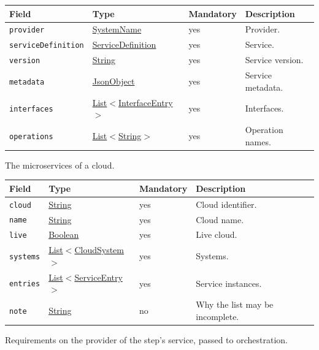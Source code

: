 \documentclass[a4paper]{arrowhead}
\newcommand{\mref}[1]{{\textcolor{ArrowheadPurple}{\hyperref[sec:model:#1]{#1}}}}
\newcommand{\pref}[1]{{\textcolor{ArrowheadGrey}{\hyperref[sec:model:primitives:#1]{#1}}}}
\begin{document}
{\small
\begin{longtable}{|p{3.7cm}|p{4.2cm}|p{1.6cm}|p{6.3cm}|}

\hline
\rowcolor{gray!33} Field & Type & Mandatory & Description \\ \hline
\endhead
\texttt{provider} & \pref{SystemName} & yes & Provider. \\ \hline
\texttt{serviceDefinition} & \pref{ServiceDefinition} & yes & Service. \\ \hline
\texttt{version} & \pref{String} & yes & Service version. \\ \hline
\texttt{metadata} & \pref{JsonObject} & yes & Service metadata. \\ \hline
\texttt{interfaces} & \pref{List}$<$\mref{InterfaceEntry}$>$ & yes & Interfaces. \\ \hline
\texttt{operations} & \pref{List}$<$\pref{String}$>$ & yes & Operation names. \\ \hline
\end{longtable}
}

The microservices of a cloud.

{\small
\begin{longtable}{|p{3.7cm}|p{4.2cm}|p{1.6cm}|p{6.3cm}|}

\hline
\rowcolor{gray!33} Field & Type & Mandatory & Description \\ \hline
\endhead
\texttt{cloud} & \pref{String} & yes & Cloud identifier. \\ \hline
\texttt{name} & \pref{String} & yes & Cloud name. \\ \hline
\texttt{live} & \pref{Boolean} & yes & Live cloud. \\ \hline
\texttt{systems} & \pref{List}$<$\mref{CloudSystem}$>$ & yes & Systems. \\ \hline
\texttt{entries} & \pref{List}$<$\mref{ServiceEntry}$>$ & yes & Service instances. \\ \hline
\texttt{note} & \pref{String} & no & Why the list may be incomplete. \\ \hline
\end{longtable}
}

Requirements on the provider of the step's service, passed to orchestration.
\end{document}
